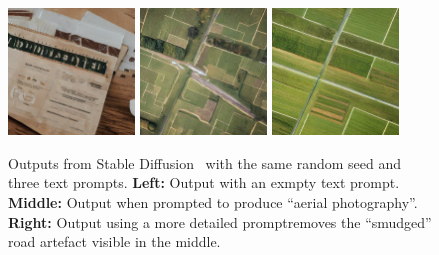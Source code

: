 \begin{figure}[t]
    \centering
    \includegraphics[width=0.3\textwidth]{figs/2sdm/sd_uncond.png}
    \hfill
    \includegraphics[width=0.3\textwidth]{figs/2sdm/uncond-aerial-photo.jpg}
    \hfill
    \includegraphics[width=0.3\textwidth]{figs/2sdm/cond-aerial-photo.jpg}
    \caption{Outputs from Stable Diffusion~\citep{rombach2022high} with the same random seed and three text prompts. \textbf{Left:} Output with an exmpty text prompt. \textbf{Middle:} Output when prompted to produce ``aerial photography''. \textbf{Right:} Output using a more detailed prompt\protect\footnotemark removes the ``smudged'' road artefact visible in the middle.}
    \label{fig:stable-diffusion-example}
\end{figure}


